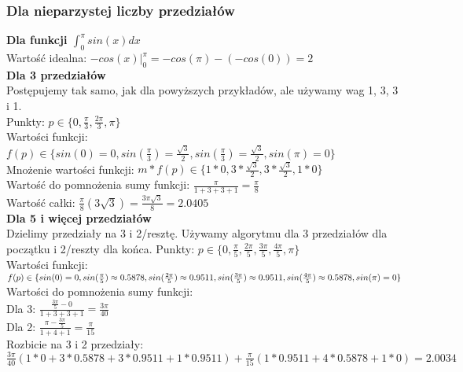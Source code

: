 \documentclass{article}
\begin{document}
\subsubsection{Dla nieparzystej liczby przedziałów}
\textbf{Dla funkcji $\int_{0}^{\pi}sin(x)dx$}\\
Wartość idealna: $-cos(x)|^\pi_0=-cos(\pi)-(-cos(0))=2$\\
\textbf{Dla 3 przedziałów}\\
Postępujemy tak samo, jak dla powyższych przykładów, ale używamy wag 1, 3, 3 i 1.\\
Punkty: $p \in \{0, \frac{\pi}{3}, \frac{2\pi}{3}, \pi\}$\\
Wartości funkcji: $f(p) \in \{sin(0)=0, sin(\frac{\pi}{3})=\frac{\sqrt{3}}{2}, sin(\frac{\pi}{3})=\frac{\sqrt{3}}{2}, sin(\pi)=0\}$\\
Mnożenie wartości funkcji: $m*f(p) \in \{1*0, 3*\frac{\sqrt{3}}{2}, 3*\frac{\sqrt{3}}{2}, 1*0\}$\\
Wartość do pomnożenia sumy funkcji: $\frac{\pi}{1+3+3+1}=\frac{\pi}{8}$\\
Wartość całki: $\frac{\pi}{8}(3\sqrt{3})=\frac{3\pi \sqrt{3}}{8}=2.0405$\\
\textbf{Dla 5 i więcej przedziałów}\\
Dzielimy przedziały na 3 i 2/resztę. Używamy algorytmu dla 3 przedziałów dla początku i 2/reszty dla końca.
Punkty: $p \in \{0, \frac{\pi}{5}, \frac{2\pi}{5}, \frac{3\pi}{5}, \frac{4\pi}{5}, \pi\}$\\
Wartości funkcji: $f(p) \in \{sin(0)=0, sin(\frac{\pi}{5})\approx 0.5878, sin(\frac{2\pi}{5})\approx 0.9511, sin(\frac{3\pi}{5})\approx 0.9511,\\ sin(\frac{4\pi}{5})\approx 0.5878, sin(\pi)=0\}$\\
Wartości do pomnożenia sumy funkcji:\\
Dla 3: $\frac{\frac{3\pi}{5}-0}{1+3+3+1}=\frac{3\pi}{40}$\\
Dla 2: $\frac{\pi-\frac{3\pi}{5}}{1+4+1}=\frac{\pi}{15}$\\
Rozbicie na 3 i 2 przedziały: $\frac{3\pi}{40}(1*0+3*0.5878+3*0.9511+1*0.9511) + \frac{\pi}{15}(1*0.9511+4*0.5878+1*0)=2.0034$
\end{document}
